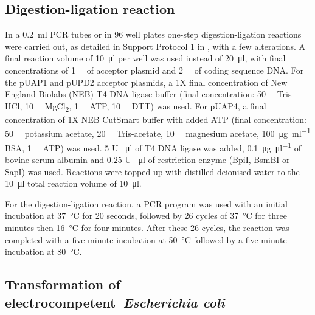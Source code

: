 \documentclass[../main.tex]{subfiles}
\begin{document}
\subsection{Digestion-ligation reaction}\label{chapter2:methods:digestion-ligation-reaction}

In a \SI{0.2}{\milli\litre} PCR tubes or in 96 well plates one-step digestion-ligation reactions were carried out, as detailed in Support Protocol 1 in \textcite*{patronDNAAssemblyPlant2016}, with a few alterations.
A final reaction volume of \SI{10}{\micro\litre} per well was used instead of \SI{20}{\micro\litre}, with final concentrations of \SI{1}{\nano\Molar} of acceptor
plasmid and \SI{2}{\nano\Molar} of coding sequence DNA.
For the pUAP1 and pUPD2 acceptor plasmids, a 1X final concentration of New England Biolabs (NEB) T4 DNA ligase buffer (final concentration: \SI{50}{\milli\Molar} Tris-HCl, \SI{10}{\milli\Molar} MgCl\textsubscript{2}, \SI{1}{\milli\Molar} ATP, \SI{10}{\milli\Molar} DTT) was used.
For pUAP4, a final concentration of 1X NEB CutSmart buffer with added ATP (final concentration: \SI{50}{\milli\Molar} potassium acetate, \SI{20}{\milli\Molar} Tris-acetate, \SI{10}{\milli\Molar} magnesium acetate, \SI{100}{\micro\gram\per\ml} BSA, \SI{1}{\milli\Molar} ATP) was used.
5 U \si{\per\ul} of T4 DNA ligase was added, \SI{0.1}{\micro\gram\per\ul} of bovine serum albumin and 0.25 U \si{\per\micro\litre} of restriction enzyme (BpiI, BsmBI or SapI) was used. Reactions were topped up with distilled deionised water to the \SI{10}{\micro\litre} total reaction volume of \SI{10}{\micro\litre}.

For the digestion-ligation reaction, a PCR program was used with an initial incubation at \SI{37}{\degreeCelsius} for 20 seconds, followed by 26 cycles of \SI{37}{\degreeCelsius} for three minutes then \SI{16}{\degreeCelsius} for four minutes.
After these 26 cycles, the reaction was completed with a five minute incubation at \SI{50}{\degreeCelsius} followed by a five minute incubation at \SI{80}{\degreeCelsius}.

\subsection{Transformation of electrocompetent~\textit{Escherichia coli}}\label{chapter2:methods:transformation-of-electrocompetent-escherichia-coli}
\end{document}
